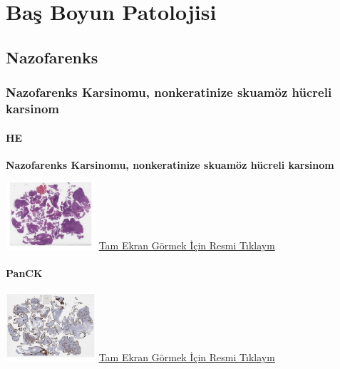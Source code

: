 \documentclass[
  letterpaper,
  DIV=11,
  numbers=noendperiod]{scrreprt}
\begin{document}
\part{Baş Boyun Patolojisi}

\hypertarget{sec-nazofarenks}{%
\chapter{Nazofarenks}\label{sec-nazofarenks}}

\hypertarget{sec-nazofarenks-karsinomu-nonkeratinize-skuamoz-hucreli-karsinom}{%
\section{Nazofarenks Karsinomu, nonkeratinize skuamöz hücreli
karsinom}\label{sec-nazofarenks-karsinomu-nonkeratinize-skuamoz-hucreli-karsinom}}

\hypertarget{he-10}{%
\subsection{HE}\label{he-10}}

\textbf{Nazofarenks Karsinomu, nonkeratinize skuamöz hücreli karsinom}

\href{https://images.patolojiatlasi.com/nasopharynx-nonkeratinizing-scc/HE.html}{\includegraphics[width=0.25\textwidth,height=\textheight]{./screenshots/nasopharynx-nonkeratinizing-scc-HE_screenshot.png}}
\href{https://images.patolojiatlasi.com/nasopharynx-nonkeratinizing-scc/HE.html}{Tam
Ekran Görmek İçin Resmi Tıklayın}

\hypertarget{panck}{%
\subsection{PanCK}\label{panck}}

\href{https://images.patolojiatlasi.com/nasopharynx-nonkeratinizing-scc/panCK.html}{\includegraphics[width=0.25\textwidth,height=\textheight]{./screenshots/nasopharynx-nonkeratinizing-scc-panCK_screenshot.png}}
\href{https://images.patolojiatlasi.com/nasopharynx-nonkeratinizing-scc/panCK.html}{Tam
Ekran Görmek İçin Resmi Tıklayın}
\end{document}
